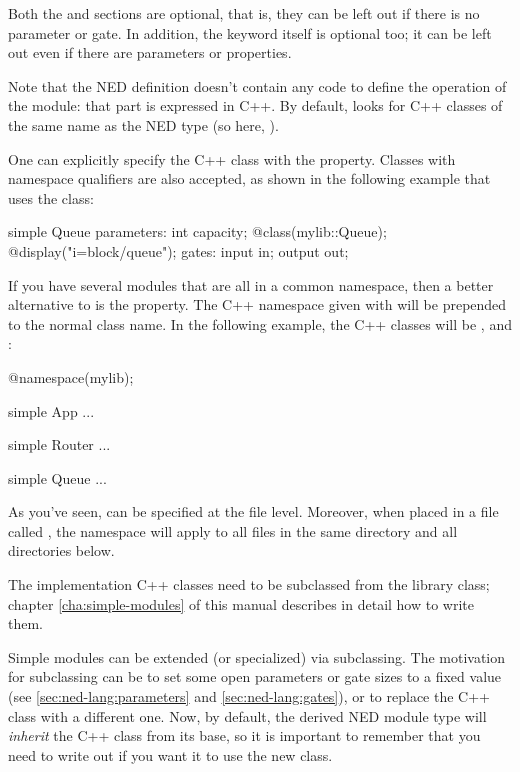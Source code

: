 Both the  and  sections are optional, that is,
they can be left out if there is no parameter or gate. In addition, the
 keyword itself is optional too; it can be left out
even if there are parameters or properties.

Note that the NED definition doesn't contain any code to define the
operation of the module: that part is expressed in C++. By default, {\opp}
looks for C++ classes of the same name as the NED type (so here, ).

One can explicitly specify the C++ class with the  property.
Classes with namespace qualifiers are also accepted, as shown in the following
example that uses the  class:

\begin{ned}
simple Queue
{
    parameters:
        int capacity;
        @class(mylib::Queue);
        @display("i=block/queue");
    gates:
        input in;
        output out;
}
\end{ned}

If you have several modules that are all in a common namespace, then a
better alternative to  is the  property. The
C++ namespace given with  will be prepended to the normal
class name. In the following example, the C++ classes will be
,  and :

\begin{ned}
@namespace(mylib);

simple App {
   ...
}

simple Router {
   ...
}

simple Queue {
   ...
}
\end{ned}

As you've seen,  can be specified at the file level. Moreover,
when placed in a file called , the namespace will apply to
all files in the same directory and all directories below.

The implementation C++ classes need to be subclassed from the
 library class; chapter \ref{cha:simple-modules} of
this manual describes in detail how to write them.

Simple modules can be extended (or specialized) via subclassing. The
motivation for subclassing can be to set some open parameters or gate sizes
to a fixed value (see \ref{sec:ned-lang:parameters} and
\ref{sec:ned-lang:gates}), or to replace the C++ class with a different
one. Now, by default, the derived NED module type will \textit{inherit} the
C++ class from its base, so it is important to remember that you need to
write out  if you want it to use the new class.

